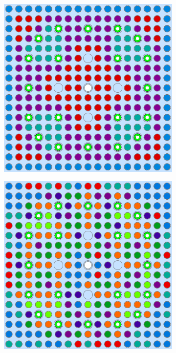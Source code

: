 \begin{appendices}
\begin{figure}[h!]
\begin{subfigure}{0.48\textwidth}
\end{subfigure}%
\begin{subfigure}{0.48\textwidth}
  \centering
  \includegraphics[width=0.85\linewidth]{figures/unsupervised/geometries/without-features/4-clusters/combined/assm-31-20BPs}
  \caption{}
  \label{fig:no-features-assm-31-20BPs-combined-4}
\end{subfigure}
\begin{subfigure}{0.48\textwidth}
  \centering
  \includegraphics[width=0.85\linewidth]{figures/unsupervised/geometries/without-features/8-clusters/pinch/assm-31-20BPs}

\end{subfigure}
\end{figure}
\end{appendices}

